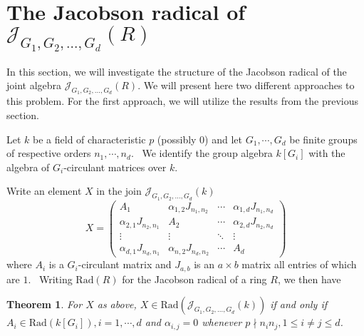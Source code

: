 \documentclass[12pt, a4paper]{amsart}
\numberwithin{equation}{section} %
\theoremstyle{plain}
\newtheorem{thm}{Theorem}[section]
\theoremstyle{definition}
\theoremstyle{plain}
\theoremstyle{remark}
\newcommand{\ones}{J}
\newcommand{\sJ}{\mathcal{J}}
\begin{document}
\section{ The Jacobson radical of $\mathcal{J}_{G_1, G_2, \ldots, G_d}(R)$}
In this section, we will investigate the structure of the Jacobson radical of the joint algebra $\sJ_{G_1, G_2, \ldots, G_d}(R)$. We will present here two different approaches to this problem. For the first approach, we will utilize the results from the previous section. 


Let $k$ be a field of characteristic $p$ (possibly 0) and let $G_{1},\cdots
,G_{d}$ be finite groups of respective orders $n_{1},\cdots ,n_{d}$. \ We
identify the group algebra $k[G_{i}]$ with the algebra of $G_{i}$-circulant
matrices over $k$.

Write an element $X$ in the join $\mathcal{J}_{G_1, G_2, \ldots, G_d}(k)$ 
\[
X=\left( 
\begin{array}{llll}
A_{1} & \alpha _{1,2}\ones_{n_{1},n_{2}} & \cdots  & \alpha _{1,d}\ones_{n_{1},n_{d}}
\\ 
\alpha _{2,1}\ones_{n_{2},n_{1}} & A_{2} & \cdots  & \alpha _{2,d}\ones_{n_{2},n_{d}}
\\ 
\vdots  & \vdots  & \ddots  & \vdots  \\ 
\alpha _{d,1}\ones_{n_{d},n_{1}} & \alpha _{n,2}\ones_{n_{d},n_{2}} & \cdots  & A_{d}%
\end{array}%
\right) 
\]%
where $A_{i}$ is a $G_{i}$-circulant matrix and $\ones_{a,b}$ is an $a\times b$
matrix all entries of which are $1$. \ Writing $\text{Rad}(R)$ for the Jacobson
radical of a ring $R$, we then have

\begin{thm}
For $X$ as above, $X\in \text{Rad}(\mathcal{J}_{G_1, G_2, \ldots, G_d}(k))$ if
and only if $A_{i}\in \text{Rad}(k[G_{i}]),i=1,\cdots ,d$ and $\alpha _{i,j}=0$
whenever $p\nmid n_{i}n_{j},1\leq i\neq j\leq d$.
\end{thm}
\end{document}
